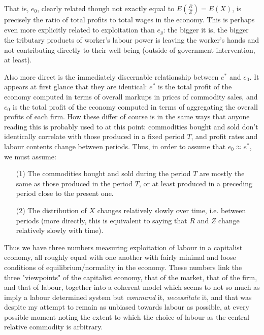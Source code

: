 \documentclass{article}
\theoremstyle{definition}
\theoremstyle{plain}
\theoremstyle{theorem}
\begin{document}
That is, $e_0$, clearly related though not exactly equal to $E\left( \frac{R}{Z} \right) = E(X)$, is precisely the ratio of total profits to total wages in the economy. This is perhaps even more explicitly related to exploitation than $e_g$: the bigger it is, the bigger the tributary products of worker's labour power is leaving the worker's hands and not contributing directly to their well being (outside of government intervention, at least). \par 
Also more direct is the immediately discernable relationship between $e^*$ and $e_0$. It appears at first glance that they are identical: $e^*$ is the total profit of the economy computed in terms of overall markups in prices of commodity sales, and $e_0$ is the total profit of the economy computed in terms of aggregating the overall profits of each firm. How these differ of course is in the same ways that anyone reading this is probably used to at this point: commodities bought and sold don't identically correlate with those produced in a fixed period $T$, and profit rates and labour contents change between periods. Thus, in order to assume that $e_0 \approx e^*$, we must assume:
\begin{itemize}
	\item[(1)] The commodities bought and sold during the period $T$ are mostly the same as those produced in the period $T$, or at least produced in a preceding period close to the present one.
	\item[(2)] The distribution of $X$ changes relatively slowly over time, i.e. between periods (more directly, this is equivalent to saying that $R$ and $Z$ change relatively slowly with time).
\end{itemize}
Thus we have three numbers measuring exploitation of labour in a capitalist economy, all roughly equal with one another with fairly minimal and loose conditions of equilibrium/normality in the economy. These numbers link the three "viewpoints" of the capitalist economy, that of the market, that of the firm, and that of labour, together into a coherent model which seems to not so much as imply a labour determined system but \textit{command} it, \textit{necessitate} it, and that was despite my attempt to remain as unbiased towards labour as possible, at every possible moment noting the extent to which the choice of labour as the central relative commodity is arbitrary. \par 
\end{document}
